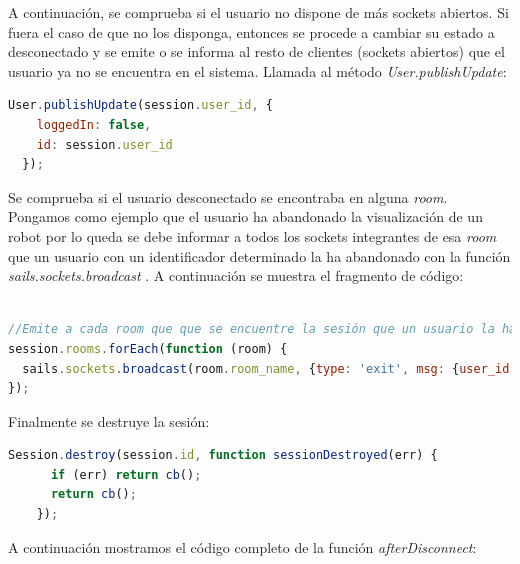 A continuación, se comprueba si el usuario no dispone de más sockets abiertos. Si fuera el caso de que no los disponga, entonces se procede a cambiar su estado a desconectado y se emite o se informa al resto de clientes (sockets abiertos)
que el usuario ya no se encuentra en el sistema. Llamada al método \emph{User.publishUpdate}: \\

\begin{lstlisting}[language=JavaScript]
   User.publishUpdate(session.user_id, {
    loggedIn: false,
    id: session.user_id
  });
\end{lstlisting}


Se comprueba si el usuario desconectado se encontraba en alguna \emph{room}. Pongamos como ejemplo que el usuario ha abandonado la visualización de un robot por lo queda
se debe informar a todos los sockets integrantes de esa \emph{room} que un usuario con un identificador determinado la ha abandonado con la función \emph{ sails.sockets.broadcast }.
A continuación se muestra el fragmento de código:\\

\begin{lstlisting}[language=JavaScript]

//Emite a cada room que que se encuentre la sesión que un usuario la ha abandonado
session.rooms.forEach(function (room) {
  sails.sockets.broadcast(room.room_name, {type: 'exit', msg: {user_id: session.user_id}});
});

\end{lstlisting}

Finalmente se destruye la sesión:\\

\begin{lstlisting}[language=JavaScript]
    Session.destroy(session.id, function sessionDestroyed(err) {
      if (err) return cb();
      return cb();
    });
\end{lstlisting}


A continuación mostramos el código completo de la función \emph{afterDisconnect}:\\


